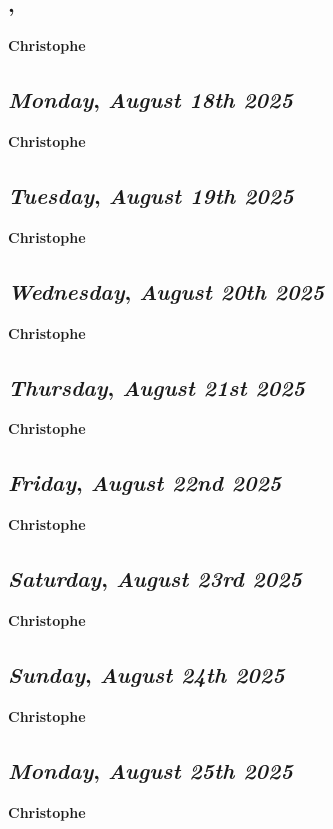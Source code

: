 \subsection*{\weekday, \day}
\textbf {Christophe}

\def\day{\textit{August 18th 2025}}
\def\weekday{\textit{Monday}}
\subsection*{\weekday, \day}
\textbf {Christophe}

\def\day{\textit{August 19th 2025}}
\def\weekday{\textit{Tuesday}}
\subsection*{\weekday, \day}
\textbf {Christophe}

\def\day{\textit{August 20th 2025}}
\def\weekday{\textit{Wednesday}}
\subsection*{\weekday, \day}
\textbf {Christophe}

\def\day{\textit{August 21st 2025}}
\def\weekday{\textit{Thursday}}
\subsection*{\weekday, \day}
\textbf {Christophe}

\def\day{\textit{August 22nd 2025}}
\def\weekday{\textit{Friday}}
\subsection*{\weekday, \day}
\textbf {Christophe}

\def\day{\textit{August 23rd 2025}}
\def\weekday{\textit{Saturday}}
\subsection*{\weekday, \day}
\textbf {Christophe}

\def\day{\textit{August 24th 2025}}
\def\weekday{\textit{Sunday}}
\subsection*{\weekday, \day}
\textbf {Christophe}

\def\day{\textit{August 25th 2025}}
\def\weekday{\textit{Monday}}
\subsection*{\weekday, \day}
\textbf {Christophe}

